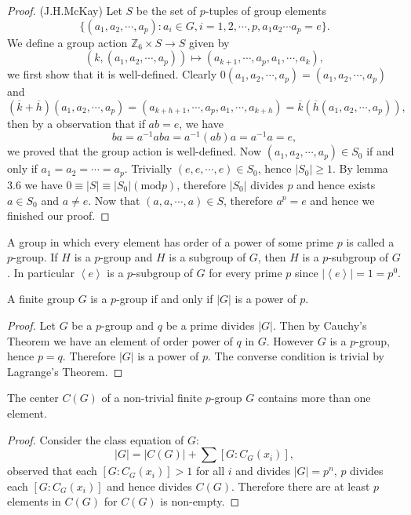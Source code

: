 \begin{proof}(J.H.McKay)
Let $S$ be the set of $p$-tuples of group elements 
$$\{(a_1,a_2,\cdots,a_p):a_i\in G,i=1,2,\cdots,p,a_1a_2\cdots a_p=e\}.$$
We define a group action $\mathbb{Z}_6\times S\to S$ given by 
$$(k,(a_1,a_2,\cdots,a_p))\mapsto(a_{k+1},\cdots,a_p,a_1,\cdots,a_k),$$
we first show that it is well-defined. Clearly $0\left( a_1,a_2,\cdots ,a_p \right) =\left( a_1,a_2,\cdots ,a_p \right) $ and 
$$
\left( \overline{k}+\overline{h} \right) \left( a_1,a_2,\cdots ,a_p \right) =\left( a_{k+h+1},\cdots ,a_p,a_1,\cdots ,a_{k+h} \right) =\overline{k}\left( \overline{h}\left( a_1,a_2,\cdots ,a_p \right) \right) ,
$$
then by a observation that if $ab=e$, we have 
$$
ba=a^{-1}aba=a^{-1}\left( ab \right) a=a^{-1}a=e,
$$
we proved that the group action is well-defined. Now $(a_1,a_2,\cdots,a_p)\in S_0$ if and only if $a_1=a_2=\cdots=a_p$. Trivially $(e,e,\cdots,e)\in S_0$, hence $|S_0|\ge 1$. By lemma 3.6 we have $0\equiv|S|\equiv|S_0|(\mathrm{mod}p)$, therefore $|S_0|$ divides $p$ and hence exists $a\in S_0$ and $a\ne e$. Now that $(a,a,\cdots,a)\in S$, therefore $a^p=e$ and hence we finished our proof.
\end{proof}
A group in which every element has order of a power of some prime $p$ is called a $p$-group. If $H$ is a $p$-group and $H$ is a subgroup of $G$, then $H$ is a $p$-subgroup of $G$. In particular $\left<e\right>$ is a $p$-subgroup of $G$ for every prime $p$ since $|\left<e\right>|=1=p^0$.
\begin{corollary}
A finite group $G$ is a $p$-group if and only if $|G|$ is a power of $p$.
\end{corollary}
\begin{proof}
Let $G$ be a $p$-group and $q$ be a prime divides $|G|$. Then by Cauchy's Theorem we have an element of order power of $q$ in $G$. However $G$ is a $p$-group, hence $p=q$. Therefore $|G|$ is a power of $p$. The converse condition is trivial by Lagrange's Theorem.
\end{proof}
\begin{corollary}
The center $C(G)$ of a non-trivial finite $p$-group $G$ contains more than one element.
\end{corollary}
\begin{proof}
Consider the class equation of $G$:
$$
\left| G \right|=\left| C\left( G \right) \right|+\sum{\left[ G:C_G\left( x_i \right) \right]},
$$
observed that each $[G:C_G(x_i)]>1$ for all $i$ and divides $|G|=p^n$, $p$ divides each $[G:C_G(x_i)]$ and hence divides $C(G)$. Therefore there are at least $p$ elements in $C(G)$ for $C(G)$ is non-empty.
\end{proof}
